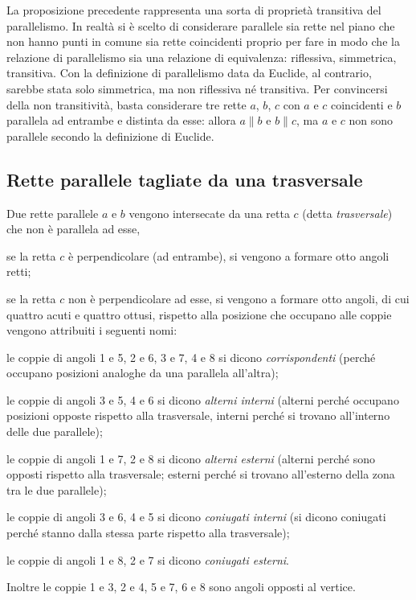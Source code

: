 \begin{osservazione}
La proposizione precedente rappresenta una sorta di proprietà transitiva del parallelismo. In realtà si è scelto di considerare parallele sia rette nel piano che non hanno punti in comune sia rette coincidenti proprio per fare in modo che la relazione di parallelismo sia una relazione di equivalenza: riflessiva, simmetrica, transitiva. Con la definizione di parallelismo data da Euclide, al contrario, sarebbe stata solo simmetrica, ma non riflessiva né transitiva. Per convincersi della non transitività, basta considerare tre rette $a$, $b$, $c$ con $a$ e $c$ coincidenti e $b$ parallela ad entrambe e distinta da esse: allora $a\parallel b$ e $b \parallel c$, ma $a$ e $c$ non sono parallele secondo la definizione di Euclide.
\end{osservazione}

\subsection{Rette parallele tagliate da una trasversale}

Due rette parallele $a$ e $b$ vengono intersecate da una retta $c$ (detta \emph{trasversale}) che non è parallela ad esse,
\begin{itemize*}
\item se la retta $c$ è perpendicolare (ad entrambe), si vengono a formare otto angoli retti; 
\item se la retta $c$ non è perpendicolare ad esse, si vengono a formare otto angoli, di cui quattro acuti e quattro ottusi, rispetto alla posizione che occupano alle coppie vengono attribuiti i seguenti nomi:
\begin{itemize*}
\item le coppie di angoli 1 e 5, 2 e 6, 3 e 7, 4 e 8 si dicono \emph{corrispondenti} (perché occupano posizioni analoghe da una parallela all'altra);
\item le coppie di angoli 3 e 5, 4 e 6 si dicono \emph{alterni interni} (alterni perché occupano posizioni opposte rispetto alla trasversale, interni perché si trovano all'interno delle due parallele);
\item le coppie di angoli 1 e 7, 2 e 8 si dicono \emph{alterni esterni} (alterni perché sono opposti rispetto alla trasversale; esterni perché si trovano all'esterno della zona tra le due parallele);
\item le coppie di angoli 3 e 6, 4 e 5 si dicono \emph{coniugati interni} (si dicono coniugati perché stanno dalla stessa parte rispetto alla trasversale);
\item le coppie di angoli 1 e 8, 2 e 7 si dicono \emph{coniugati esterni}.
\end{itemize*}
\end{itemize*}
Inoltre le coppie 1 e 3, 2 e 4, 5 e 7, 6 e 8 sono angoli opposti al vertice.


